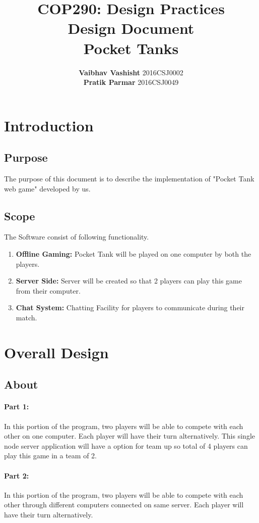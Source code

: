\documentclass[12pt]{extarticle}
\date{}
\author{\textbf{Vaibhav Vashisht} 2016CSJ0002  \\\textbf{Pratik Parmar} 2016CSJ0049}
\title{\textbf{COP290: Design Practices\\ Design Document \\ Pocket Tanks  }}
\begin{document}
\maketitle
\newpage
\tableofcontents
\newpage
\section{Introduction}

\subsection{Purpose}
The purpose of this document is to describe the implementation of "Pocket Tank web game" developed by us.
\subsection{Scope}
The Software consist of following functionality.
\begin{enumerate}
\item \textbf{Offline Gaming:} Pocket Tank will be played on one computer by both the players.
\item \textbf{Server Side:} Server will be created so that 2 players can play this game from their computer.
\item \textbf{Chat System:} Chatting Facility for players to communicate during their match.
\end{enumerate}

\section{Overall Design}
\subsection{About}

\paragraph{Part 1:}In this portion of the program, two players will be able to compete with each other on one computer. Each player will have their turn alternatively. This single node server application will have a option for team up so total of 4 players can play this game in a team of 2.

\paragraph{Part 2:}
In this portion of the program, two players will be able to compete with each other through different computers connected on same server. Each player will have their turn alternatively.	
\end{document}
